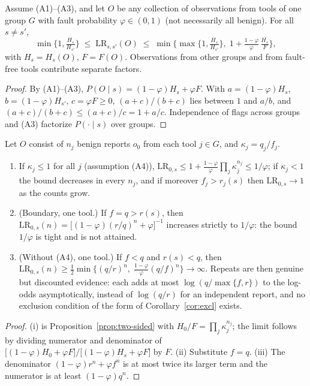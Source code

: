\begin{proposition}\label{prop:two-sided}
Assume (A1)--(A3), and let $O$ be any collection of observations from tools of one group $G$ with fault probability
$\varphi\in(0,1)$ (not necessarily all benign). For all $s\neq s'$,
\[
\min\Big\{1,\tfrac{H_s}{H_{s'}}\Big\}\;\le\;\mathrm{LR}_{s,s'}(O)\;\le\;
\min\Big\{\max\Big\{1,\tfrac{H_s}{H_{s'}}\Big\},\;1+\tfrac{1-\varphi}{\varphi}\,\tfrac{H_s}{F}\Big\},
\]
with $H_s=H_s(O)$, $F=F(O)$. Observations from other groups and from fault-free tools contribute separate factors.
\end{proposition}
\begin{proof}
By (A1)--(A3), $P(O\mid s)=(1-\varphi)H_s+\varphi F$. With $a=(1-\varphi)H_s$, $b=(1-\varphi)H_{s'}$, $c=\varphi F\ge0$,
$(a+c)/(b+c)$ lies between $1$ and $a/b$, and $(a+c)/(b+c)\le (a+c)/c=1+a/c$. Independence of flags across groups
and (A3) factorize $P(\cdot\mid s)$ over groups.
\end{proof}

\begin{corollary}\label{cor:boundary}
Let $O$ consist of $n_j$ benign reports $o_0$ from each tool $j\in G$, and $\kappa_j=q_j/f_j$.
\begin{enumerate}
\item[(i)] If $\kappa_j\le 1$ for all $j$ (assumption (A4)), $\mathrm{LR}_{0,s}\le 1+\frac{1-\varphi}{\varphi}\prod_j\kappa_j^{n_j}\le 1/\varphi$;
if $\kappa_j<1$ the bound decreases in every $n_j$, and if moreover $f_j>r_j(s)$ then $\mathrm{LR}_{0,s}\to1$ as the counts grow.
\item[(ii)] (Boundary, one tool.) If $f=q>r(s)$, then $\mathrm{LR}_{0,s}(n)=\big[(1-\varphi)(r/q)^n+\varphi\big]^{-1}$ increases
strictly to $1/\varphi$: the bound $1/\varphi$ is tight and is not attained.
\item[(iii)] (Without (A4), one tool.) If $f<q$ and $r(s)<q$, then
$\mathrm{LR}_{0,s}(n)\ge\tfrac12\min\{(q/r)^n,\;\tfrac{1-\varphi}{\varphi}(q/f)^n\}\to\infty$.
Repeats are then genuine but discounted evidence: each adds at most $\log(q/\max\{f,r\})$ to the log-odds asymptotically,
instead of $\log(q/r)$ for an independent report, and no exclusion condition of the form of Corollary~\ref{cor:excl} exists.
\end{enumerate}
\end{corollary}
\begin{proof}
(i) is Proposition~\ref{prop:two-sided} with $H_0/F=\prod_j\kappa_j^{n_j}$; the limit follows by dividing numerator and
denominator of $\big[(1-\varphi)H_0+\varphi F\big]/\big[(1-\varphi)H_s+\varphi F\big]$ by $F$.
(ii) Substitute $f=q$. (iii) The denominator $(1-\varphi)r^n+\varphi f^n$ is at most twice its larger term and the
numerator is at least $(1-\varphi)q^n$.
\end{proof}

